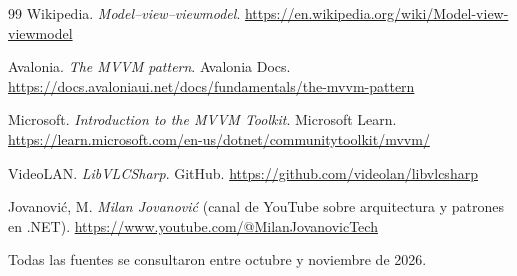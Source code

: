 \documentclass{article}
\begin{document}
\begin{thebibliography}{99}
	Wikipedia. \emph{Model--view--viewmodel}.
	\url{https://en.wikipedia.org/wiki/Model-view-viewmodel}

	Avalonia. \emph{The MVVM pattern}. Avalonia Docs.
	\url{https://docs.avaloniaui.net/docs/fundamentals/the-mvvm-pattern}

	Microsoft. \emph{Introduction to the MVVM Toolkit}. Microsoft Learn.
	\url{https://learn.microsoft.com/en-us/dotnet/communitytoolkit/mvvm/}

	VideoLAN. \emph{LibVLCSharp}. GitHub.
	\url{https://github.com/videolan/libvlcsharp}

	Jovanovi\'c, M. \emph{Milan Jovanovi\'c} (canal de YouTube sobre
	arquitectura y patrones en .NET).
	\url{https://www.youtube.com/@MilanJovanovicTech}

\end{thebibliography}

\noindent Todas las fuentes se consultaron entre octubre y noviembre de 2026.
\end{document}
